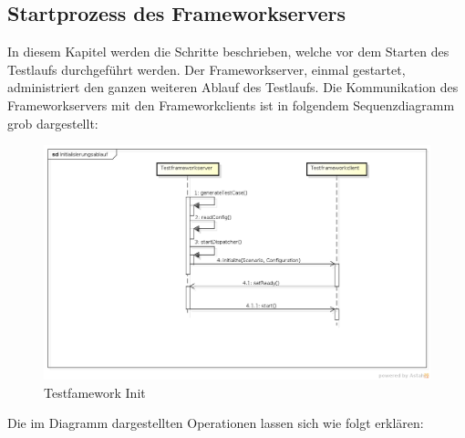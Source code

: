 \subsection{Startprozess des Frameworkservers}
\label{sec:startFramework}
In diesem Kapitel werden die Schritte beschrieben, welche vor dem Starten des Testlaufs durchgeführt werden. Der Frameworkserver, einmal gestartet, administriert den ganzen weiteren Ablauf des Testlaufs. \newline
Die Kommunikation des Frameworkservers mit den Frameworkclients ist in folgendem Sequenzdiagramm grob dargestellt:


\begin{figure}
\begin{center}
\includegraphics[scale=0.3]{image_testFramework/TestFWInit.png}
\end{center}
\caption{Testfamework Init}
\label{labelname}
\end{figure}

Die im Diagramm dargestellten Operationen lassen sich wie folgt erklären:


